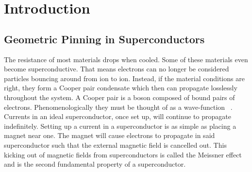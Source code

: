 \chapter{Introduction}		%
\label{introchap}

\label{section}

\section{Geometric Pinning in Superconductors}

The resistance of most materials drops when cooled. Some of these materials even become superconductive. That means electrons can no longer be considered particles bouncing around from ion to ion. Instead, if the material conditions are right, they form a Cooper pair condensate which then can propagate losslessly throughout the system. A Cooper pair is a boson composed of bound pairs of electrons. Phenomenologically they must be thought of as a wave-function ~\cite{Miszczak15}. Currents in an ideal superconductor, once set up, will continue to propagate indefinitely. Setting up a current in a superconductor is as simple as placing a magnet near one. The magnet will cause electrons to propagate in said superconductor such that the external magnetic field is cancelled out. This kicking out of magnetic fields from superconductors is called the Meissner effect and is the second fundamental property of a superconductor.

